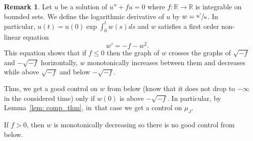 \documentclass[10pt]{amsart}
\theoremstyle{definition}
\newtheorem{remark}[theorem]{Remark}
\renewcommand{\>}{{\rangle}}
\newcommand{\<}{{\langle}}
\begin{document}
\begin{remark}\label{rem: behavior of Riccati solution}
Let $u$ be a solution of $u''+fu=0$ where $f\colon \mathbb R\to\mathbb R$ is integrable on bounded sets. We define the logarithmic derivative of $u$ by $w=\sfrac{u'}{u}$. In particular, $u(t)=u(0)\exp{\int_0^t}w(s)ds$ and $w$ satisfies a first order non-linear equation
\[
w'=-f-w^2.
\]
This equation shows that if $f\leq 0$ then the graph of $w$ crosses the graphs of $\sqrt{-f}$ and $-\sqrt{-f}$ horizontally, $w$ monotonically increases between them and decreases while above $\sqrt{-f}$ and below $-\sqrt{-f}$.

Thus, we get a good control on $w$ from below (know that it does not drop to $-\infty$ in the considered time) only if $w(0)$ is above $-\sqrt{-f}$. In particular, by Lemma~\ref{lem: comp_thm}, in~that case we get a control on $\mu_J$.

If $f>0$, then $w$ is monotonically decreasing so there is no good control from below.
\end{remark}
\end{document}
